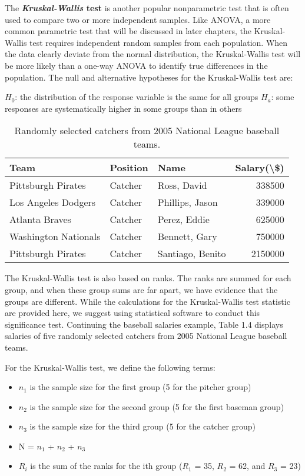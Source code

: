 \documentclass[
]{report}
\providecommand{\tightlist}{%
  \setlength{\itemsep}{0pt}\setlength{\parskip}{0pt}}
\theoremstyle{definition}
\theoremstyle{definition}
\theoremstyle{definition}
\theoremstyle{definition}
\theoremstyle{remark}
\begin{document}
The \textbf{\emph{Kruskal-Wallis} test} is another popular nonparametric test that is often used to compare two or more independent samples. Like ANOVA, a more common parametric test that will be discussed in later chapters, the Kruskal-Wallis test requires independent random samples from each population. When the data clearly deviate from the normal distribution, the Kruskal-Wallis test will be more likely than a one-way ANOVA to identify true differences in the population. The null and alternative hypotheses for the Kruskal-Wallis test are:

\(H_0\): the distribution of the response variable is the same for all groups
\(H_a\): some responses are systematically higher in some groups than in others

\begin{table}

\caption{\label{tab:table4}Randomly selected catchers from 2005 National League baseball teams.}
\centering
\begin{tabular}[t]{lllr}
\toprule
Team & Position & Name & Salary(\textbackslash{}\$)\\
\midrule
Pittsburgh Pirates & Catcher & Ross, David & 338500\\
Los Angeles Dodgers & Catcher & Phillips, Jason & 339000\\
Atlanta Braves & Catcher & Perez, Eddie & 625000\\
Washington Nationals & Catcher & Bennett, Gary & 750000\\
Pittsburgh Pirates & Catcher & Santiago, Benito & 2150000\\
\bottomrule
\end{tabular}
\end{table}

The Kruskal-Wallis test is also based on ranks. The ranks are summed for each group, and when these group sums are far apart, we have evidence that the groups are different. While the calculations for the Kruskal-Wallis test statistic are provided here, we suggest using statistical software to conduct this significance test. Continuing the baseball salaries example, Table 1.4 displays salaries of five randomly selected catchers from 2005 National League baseball teams.

For the Kruskal-Wallis test, we define the following terms:

\begin{itemize}
\tightlist
\item
  \(n_1\) is the sample size for the first group (5 for the pitcher group)
\item
  \(n_2\) is the sample size for the second group (5 for the first baseman group)
\item
  \(n_3\) is the sample size for the third group (5 for the catcher group)
\item
  N = \(n_1\) + \(n_2\) + \(n_3\)
\item
  \(R_i\) is the sum of the ranks for the ith group (\(R_1\) = 35, \(R_2\) = 62, and \(R_3\) = 23)
\end{itemize}
\end{document}
